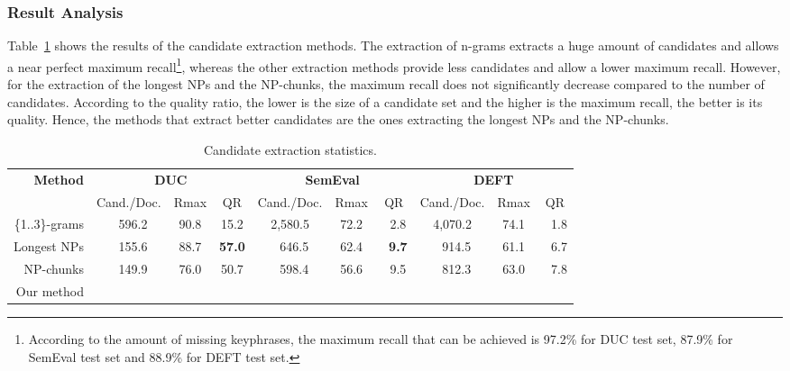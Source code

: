     \subsubsection{Result Analysis}
    \label{subsubsec:candidate_extraction_result_analysis}
      Table~\ref{tab:candidate_extraction_statistics} shows the results of the
      candidate extraction methods. The extraction  of n-grams extracts a huge
      amount of candidates and allows a near perfect maximum
      recall\footnote{According to the amount of missing keyphrases, the maximum
      recall that can be achieved is 97.2\% for DUC test set, 87.9\% for SemEval
      test set and 88.9\% for DEFT  test set.}, whereas the other extraction
      methods provide less candidates and allow a lower maximum recall. However,
      for the extraction of the longest NPs and the NP-chunks, the maximum
      recall does not significantly decrease compared to the number of
      candidates. According to the quality ratio, the lower is the size of a
      candidate set and the higher is the maximum recall, the better is its
      quality. Hence, the methods that extract better candidates are the ones
      extracting the longest NPs and the NP-chunks.%
      \begin{table}
        \centering
        \begin{tabular}{r@{~~}c@{~~}c@{~~}c@{~~}c@{~~}c@{~~}c@{~~}c@{~~}c@{~~}c}
          \toprule
          \multirow{2}{*}[-2pt]{\textbf{Method}} & \multicolumn{3}{c}{\textbf{DUC}} & \multicolumn{3}{c}{\textbf{SemEval}} & \multicolumn{3}{c}{\textbf{DEFT}}\\
          \cmidrule(r){2-4}\cmidrule(r){5-7}\cmidrule{8-10}
          & Cand./Doc. & Rmax & QR & Cand./Doc. & Rmax & QR & Cand./Doc. & Rmax &
          QR\\
          \midrule
          \{1..3\}-grams & $~~~$596.2 & 90.8 & 15.2 & 2,580.5 & 72.2 & $~~~$2.8 & 4,070.2 & 74.1 & $~~~$1.8\\
          Longest NPs & $~~~$155.6 & 88.7 & \textbf{57.0} & $~~~$646.5 & 62.4 & \textbf{$~~~$9.7} & $~~~$914.5 & 61.1 & $~~~$6.7\\
          NP-chunks & $~~~$149.9 & 76.0 & 50.7 & $~~~$598.4 & 56.6 & $~~~$9.5 & $~~~$812.3 & 63.0 & $~~~$7.8\\
          Our method\\
          \bottomrule
        \end{tabular}
        \caption{Candidate extraction statistics.
                 \label{tab:candidate_extraction_statistics}}
      \end{table}
      
